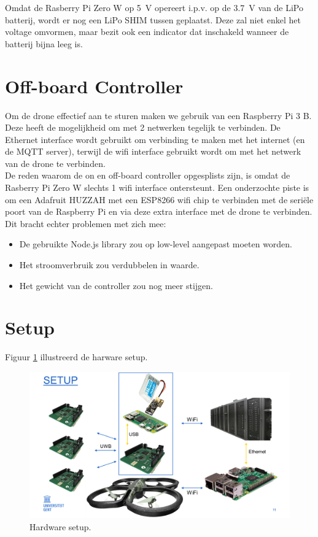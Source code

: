 Omdat de Rasberry Pi Zero W op \SI{5}{\V} opereert i.p.v. op de \SI{3.7}{\V} van de LiPo batterij, wordt er nog een LiPo SHIM tussen geplaatst.
Deze zal niet enkel het voltage omvormen, maar bezit ook een indicator dat inschakeld wanneer de batterij bijna leeg is.

\section{Off-board Controller} \label{sec:offboard_controller}
Om de drone effectief aan te sturen maken we gebruik van een Raspberry Pi 3 B.
Deze heeft de mogelijkheid om met 2 netwerken tegelijk te verbinden. De Ethernet interface wordt gebruikt om verbinding te maken met het internet (en de MQTT server), terwijl de wifi interface gebruikt wordt om met het netwerk van de drone te verbinden.\\

De reden waarom de on en off-board controller opgesplists zijn, is omdat de Rasberry Pi Zero W slechts 1 wifi interface ontersteunt.
Een onderzochte piste is om een Adafruit HUZZAH met een ESP8266 wifi chip te verbinden met de seri\"ele poort van de Raspberry Pi en via deze extra interface met de drone te verbinden.\\
Dit bracht echter problemen met zich mee:
\begin{itemize}
	\item De gebruikte Node.js library zou op low-level aangepast moeten worden.
	\item Het stroomverbruik zou verdubbelen in waarde.
	\item Het gewicht van de controller zou nog meer stijgen.
\end{itemize}

\section{Setup} \label{sec:setup_hardware}
Figuur \ref{fig:setup_hardware} illustreerd de harware setup.
\begin{figure}[p]
	\centering
	\includegraphics[width=\textwidth]{Setup}
	\caption[Hardware setup]{Hardware setup.}
	\label{fig:setup_hardware}
\end{figure}